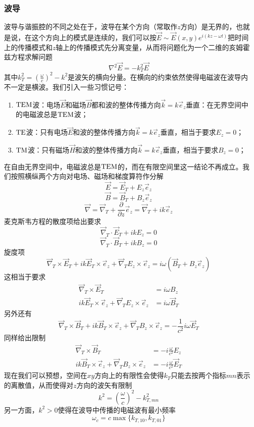 \documentclass[a4paper,11pt]{ctexart}
\newcommand{\beq}{\begin{equation}}
\newcommand{\eeq}{\end{equation}}
\newcommand{\bea}{\begin{equation}\begin{aligned}}
\newcommand{\eea}{\end{aligned}\end{equation}}
\newcommand{\del}{\vec{\nabla}}
\newcommand{\pfrac}[2]{\frac{\partial #1}{\partial #2}}
\begin{document}
\subsubsection{波导}
波导与谐振腔的不同之处在于，波导在某个方向（常取作$z$方向）是无界的，也就是说，在这个方向上的模式是连续的，我们可以按$\vec E \sim \vec E(x,y) e^{i(kz - \omega t)}$把时间上的传播模式和$z$轴上的传播模式先分离变量，从而将问题化为一个二维的亥姆霍兹方程求解问题
\beq
\nabla^2 \vec E = - k_T^2 \vec E
\eeq
其中$k_T^2 = \left(\frac{\omega}{c}\right)^2 - k^2$是波矢的横向分量。在横向的约束依然使得电磁波在波导内不一定是横波。我们引入一些习惯记号：
\begin{enumerate}
\item ${\rm TEM}$波：电场$\vec E$和磁场$\vec B$都和波的整体传播方向$\vec k = k \vec{e}_z$垂直：在无界空间中的电磁波总是${\rm TEM}$波；
\item ${\rm TE}$波：只有电场$\vec E$和波的整体传播方向$\vec k = k \vec{e}_z$垂直，相当于要求$E_z=0$；
\item ${\rm TM}$波：只有磁场$\vec H$和波的整体传播方向$\vec k = k \vec{e}_z$垂直，相当于要求$B_z=0$；
\end{enumerate}
在自由无界空间中，电磁波总是${\rm TEM}$的，而在有限空间里这一结论不再成立。我们按照横纵两个方向对电场、磁场和梯度算符作分解
\beq
\vec E = \vec{E}_T + E_z \vec{e}_z
\eeq
\beq
\vec B = \vec{B}_T + B_z \vec{e}_z
\eeq
\beq
\del = \del_T + \pfrac{}{z}\vec{e}_z = \del_T +ik\vec{e}_z
\eeq
麦克斯韦方程的散度项给出要求
\beq
\del_T \cdot \vec{E}_T +ikE_z = 0
\eeq
\beq
\del_T \cdot \vec{B}_T + ikB_z = 0
\eeq
旋度项
\beq
\del_T \times \vec{E}_T +ik\vec{E}_T \times \vec{e}_z + \del_T E_z \times \vec{e}_z = i\omega (\vec{B}_T + B_z \vec{e}_z)
\eeq
这相当于要求
\bea\label{wge}
\del_T \times \vec{E}_T&=i\omega B_z \\
ik\vec{E}_T \times \vec{e}_z + \del_T E_z \times \vec{e}_z&= i\omega \vec{B}_T
\eea
另外还有
\beq
\del_T \times \vec{B}_T +ik\vec{B}_T \times \vec{e}_z+ \del_T B_z \times \vec{e}_z =-\frac{1}{c^2} i\omega \vec{E}_T
\eeq
同样给出限制
\bea\label{wgb}
\del_T \times \vec{B}_T &= -i\frac{\omega}{c^2} E_z \\
ik\vec{B}_T \times \vec{e}_z + \del_T B_z \times \vec{e}_z&= -i\frac{\omega}{c^2} \vec{E}_T
\eea
现在我们可以预想，空间在$xy$方向上的有限性会使得$k_T$只能去按两个指标${mn}$表示的离散值，从而使得对$z$方向的波矢有限制
\beq
k^2 = \left(\frac{\omega}{c}\right)^2 - k_{T,mn}^2
\eeq
另一方面，$k^2>0$使得在波导中传播的电磁波有最小频率
\beq
\omega_{c} = c\max\{k_{T,10},k_{T,01}\}
\eeq
\end{document}
